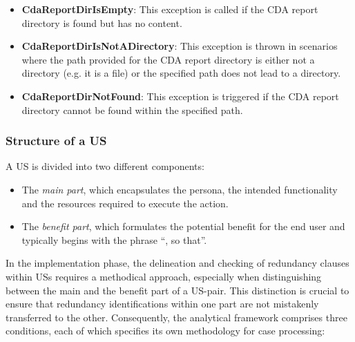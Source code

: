 \begin{itemize}
	\item \textbf{CdaReportDirIsEmpty}: This exception is called if the CDA report directory is found but has no content.
	\item \textbf{CdaReportDirIsNotADirectory}: This exception is thrown in scenarios where the path provided for the CDA report directory is either not a directory (e.g. it is a file) or the specified path does not lead to a directory.
	\item \textbf{CdaReportDirNotFound}: This exception is triggered if the CDA report directory cannot be found within the specified path.
\end{itemize}
\subsubsection*{Structure of a US}
A US is divided into two different components:
\begin{itemize}
	\item The \textit{main part}, which encapsulates the persona, the intended functionality and the resources required to execute the action.
	\item The \textit{benefit part}, which formulates the potential benefit for the end user and typically begins with the phrase \enquote{, so that}.
\end{itemize}
In the implementation phase, the delineation and checking of redundancy clauses within USs requires a methodical approach, especially when distinguishing between the main and the benefit part of a US-pair. This distinction is crucial to ensure that redundancy identifications within one part are not mistakenly transferred to the other. Consequently, the analytical framework comprises three conditions, each of which specifies its own methodology for case processing:

